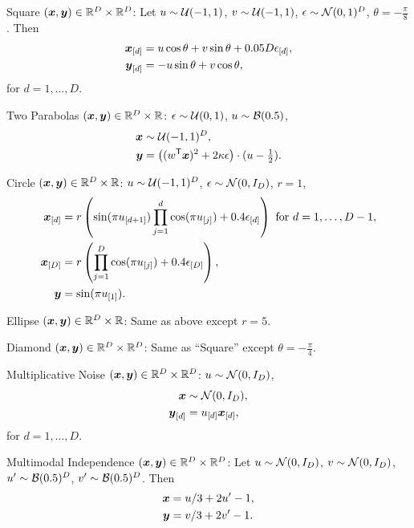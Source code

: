 \documentclass[11pt]{article}
\begin{document}
\begin{compactenum}
\item Square $(\boldsymbol{x},\boldsymbol{y}) \in \mathbb{R}^{D} \times \mathbb{R}^{D}$: Let $u \sim \mathcal{U}(-1,1)$, $v \sim \mathcal{U}(-1,1)$, $\epsilon \sim \mathcal{N}(0,1)^{D}$, $\theta=-\frac{\pi}{8}$. Then
\begin{align*}
\boldsymbol{x}_{[d]}&=u \cos\theta + v \sin\theta + 0.05 D\epsilon_{[d]},\\
\boldsymbol{y}_{[d]}&=-u \sin\theta + v \cos\theta,
\end{align*}
for $d=1,\ldots,D$.
\item Two Parabolas $(\boldsymbol{x},\boldsymbol{y}) \in \mathbb{R}^{D} \times \mathbb{R}$: $\epsilon \sim \mathcal{U}(0,1)$, $u \sim \mathcal{B}(0.5)$,
\begin{align*}
\boldsymbol{x} &\sim \mathcal{U}(-1,1)^{D},\\
\boldsymbol{y}&=\left( (w^{\mathsf{T}} \boldsymbol{x})^2  + 2\kappa\epsilon\right) \cdot (u-\tfrac{1}{2}).
\end{align*}
\item Circle $(\boldsymbol{x},\boldsymbol{y}) \in \mathbb{R}^{D} \times \mathbb{R}$: $u \sim \mathcal{U}(-1,1)^{D}$, $\epsilon \sim \mathcal{N}(0, I_{D})$, $r=1$,
\begin{align*}
\boldsymbol{x}_{[d]}&=r \left(\sin(\pi u_{[d+1]})  \prod_{j=1}^{d} \cos(\pi u_{[j]})+0.4 \epsilon_{[d]}\right) \mbox{ for $d=1,\ldots,D-1$},\\
\boldsymbol{x}_{[D]}&=r \left(\prod_{j=1}^{D} \cos(\pi u_{[j]})+0.4 \epsilon_{[D]}\right),\\
\boldsymbol{y}&= \sin(\pi u_{[1]}).
\end{align*}
\item Ellipse $(\boldsymbol{x},\boldsymbol{y}) \in \mathbb{R}^{D} \times \mathbb{R}$: Same as above except $r=5$.
\item Diamond $(\boldsymbol{x},\boldsymbol{y}) \in \mathbb{R}^{D} \times \mathbb{R}^{D}$: Same as  ``Square'' except $\theta=-\frac{\pi}{4}$.
\item Multiplicative Noise $(\boldsymbol{x},\boldsymbol{y}) \in \mathbb{R}^{D} \times \mathbb{R}^{D}$: $u \sim \mathcal{N}(0, I_{D})$, 
\begin{align*}
\boldsymbol{x} &\sim \mathcal{N}(0, I_{D}),\\
\boldsymbol{y}_{[d]}&=u_{[d]}\boldsymbol{x}_{[d]},
\end{align*}
for $d=1,\ldots,D$.
\item Multimodal Independence $(\boldsymbol{x},\boldsymbol{y}) \in \mathbb{R}^{D} \times \mathbb{R}^{D}$: Let $u \sim \mathcal{N}(0,I_{D})$, $v \sim \mathcal{N}(0,I_{D})$, $u' \sim \mathcal{B}(0.5)^{D}$, $v' \sim \mathcal{B}(0.5)^{D}$. Then
\begin{align*}
\boldsymbol{x}&=u/3+2u'-1,\\
\boldsymbol{y}&=v/3+2v'-1.
\end{align*}
\end{compactenum}
\end{document}
